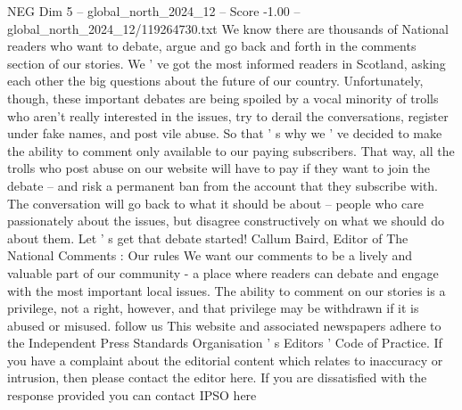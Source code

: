 \begin{textsample}{NEG Dim 5 – global\_north\_2024\_12 – Score -1.00 – global\_north\_2024\_12/119264730.txt}
We know there are thousands of National readers who want to debate, argue and go back and forth in the comments section of our stories.
We ' ve got the most informed readers in Scotland, asking each other the big questions about the future of our country.
Unfortunately, though, these important debates are being spoiled by a vocal minority of trolls who aren't really interested in the issues, try to derail the conversations, register under fake names, and post vile abuse.
So that ' s why we ' ve decided to make the ability to comment only available to our paying subscribers.
That way, all the trolls who post abuse on our website will have to pay if they want to join the debate -- and risk a permanent ban from the account that they subscribe with.
The conversation will go back to what it should be about -- people who care passionately about the issues, but disagree constructively on what we should do about them.
Let ' s get that debate started!
Callum Baird, Editor of The National Comments : Our rules We want our comments to be a lively and valuable part of our community - a place where readers can debate and engage with the most important local issues.
The ability to comment on our stories is a privilege, not a right, however, and that privilege may be withdrawn if it is abused or misused. follow us This website and associated newspapers adhere to the Independent Press Standards Organisation ' s Editors ' Code of Practice.
If you have a complaint about the editorial content which relates to inaccuracy or intrusion, then please contact the editor here.
If you are dissatisfied with the response provided you can contact IPSO here

\end{textsample}
